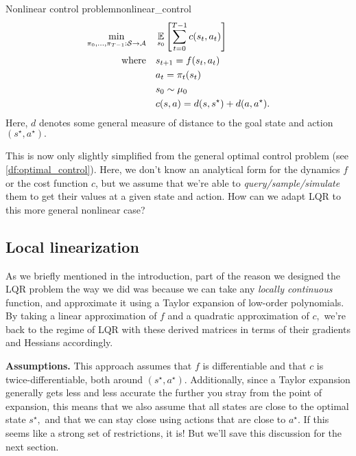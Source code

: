 \documentclass[../main/main]{subfiles}
\begin{document}
\begin{definition}{Nonlinear control problem}{nonlinear_control}
\begin{align*}
    \min_{\pi_0, \dots, \pi_{T-1} : \mathcal{S} \to \mathcal{A}} \quad & \operatorname*{\mathbb{E}}_{s_0} \left[ \sum_{t=0}^{T-1} c(s_t, a_t) \right] \\
    \text{where} \quad & s_{t+1} = f(s_t, a_t) \\
    & a_t = \pi_t(s_t) \\
    & s_0 \sim \mu_0 \\
    & c(s, a) = d(s, s^\star) + d(a, a^\star).
\end{align*}
Here, $d$ denotes some general measure of distance to the goal state and action $(s^\star, a^\star).$
\end{definition}

This is now only slightly simplified from the general optimal control problem (see \ref{df:optimal_control}). Here, we don't know an analytical form for the dynamics $f$ or the cost function $c$,
but we assume that we're able to \emph{query/sample/simulate} them
to get their values at a given state and action.
How can we adapt LQR to this more general nonlinear case?

\subsection{Local linearization}

As we briefly mentioned in the introduction, part of the reason we designed the LQR problem the way we did was because we can take any \emph{locally continuous} function, and approximate it using a Taylor expansion of low-order polynomials. By taking a linear approximation of $f$ and a quadratic approximation of $c,$ we're back to the regime of LQR with these derived matrices in terms of their gradients and Hessians accordingly.

\textbf{Assumptions.} This approach assumes that $f$ is differentiable and that $c$ is twice-differentiable, both around $(s^\star, a^\star).$
Additionally, since a Taylor expansion generally gets less and less accurate the further you stray from the point of expansion, this means that we also assume that all states are close to the optimal state $s^\star,$
and that we can stay close using actions that are close to $a^\star.$
If this seems like a strong set of restrictions, it is! But we'll save this discussion for the next section.

\end{document}
